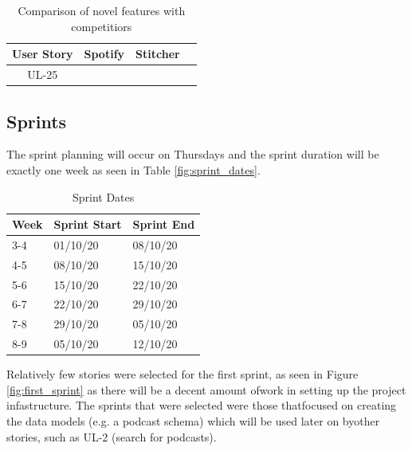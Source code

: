 \documentclass[12pt]{article}
\begin{document}

\begin{table}
    \centering
    \caption{Comparison of novel features with competitiors}
    \label{table:comparison_features}
    \bigskip
    \begin{tabular}{|c||c|c|c}
        \hline
        User Story      & Spotify       & Stitcher      \\
        \hline
        UL-25           &               &               \\

        \hline
    \end{tabular}
\end{table}

\subsection{Sprints}

The sprint planning will occur on Thursdays and the sprint duration will be exactly 
one week as seen in Table \ref{fig:sprint_dates}.

\begin{table}[]
    \centering
    \caption{Sprint Dates}
    \label{table:sprint_dates}
    \bigskip
    \begin{tabular}{|l|l|l|}
    \hline
    \textbf{Week} & \textbf{Sprint Start} & \textbf{Sprint End} \\ \hline
    3-4           & 01/10/20              & 08/10/20            \\ \hline
    4-5           & 08/10/20              & 15/10/20            \\ \hline
    5-6           & 15/10/20              & 22/10/20            \\ \hline
    6-7           & 22/10/20              & 29/10/20            \\ \hline
    7-8           & 29/10/20              & 05/10/20            \\ \hline
    8-9           & 05/10/20              & 12/10/20            \\ \hline
    \end{tabular}
\end{table}

Relatively few stories were selected for the first sprint, as seen in Figure \ref{fig:first_sprint}
as there will be a decent amount ofwork in setting up the project infastructure. 
The sprints that were selected were those thatfocused on creating the data models 
(e.g. a podcast schema) which will be used later on byother stories, such as UL-2 
(search for podcasts).
\end{document}
